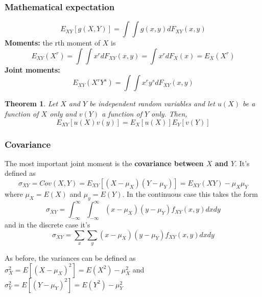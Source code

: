 \documentclass{article}
\newtheorem{theorem}{Theorem}[section]
\begin{document}
\subsubsection{Mathematical expectation}
\begin{equation*}
    E_{XY}[g(X,Y)]=\int \int g(x,y) dF_{XY}(x,y)
\end{equation*}
\textbf{Moments:} the rth moment of \(X\) is
\begin{equation*}
    E_{XY} (X^r)= \int \int x^r dF_{XY}(x,y)=\int x^r dF_X(x) = E_X(X^r)
\end{equation*}
\textbf{Joint moments:} 
\begin{equation*}
    E_{XY} (X^rY^s)= \int \int x^r y^s dF_{XY}(x,y)
\end{equation*}

\begin{theorem}
    Let \(X\) and \(Y\) be independent random variables and let \(u(X)\) be a function of \(X\) only and \(v(Y)\) a function of \(Y\) only. Then,
    \begin{equation*}
        E_{XY}[u(X)v(y)]=E_X[u(X)]E_Y[v(Y)]
    \end{equation*}
\end{theorem}

\subsubsection{Covariance}

The most important joint moment is the \textbf{covariance between \(X\) and \(Y\)}. It's defined as
\begin{equation*}
    \sigma_{XY}=Cov(X,Y)=E_{XY}[(X-\mu_X)(Y-\mu_Y)]=E_{XY}(XY)-\mu_X \mu_Y
\end{equation*}
where \(\mu_X=E(X)\) and \(\mu_y=E(Y)\). In the continuous case this takes the form
\begin{equation}
    \sigma_{XY}= \int_{-\infty}^{\infty} \int_{-\infty}^{\infty} (x-\mu_X)(y-\mu_Y) f_{XY}(x,y)dxdy
\end{equation}
and in the discrete case it's
\begin{equation}
    \sigma_{XY}= \sum_x \sum_y (x-\mu_X)(y-\mu_Y) f_{XY}(x,y)dxdy
\end{equation}

As before, the variances can be defined as \(\sigma_X^2=E[(X-\mu_X)^2]=E(X^2)-\mu_X^2\) and \(\sigma_Y^2=E[(Y-\mu_Y)^2]=E(Y^2)-\mu_Y^2\)
\end{document}
